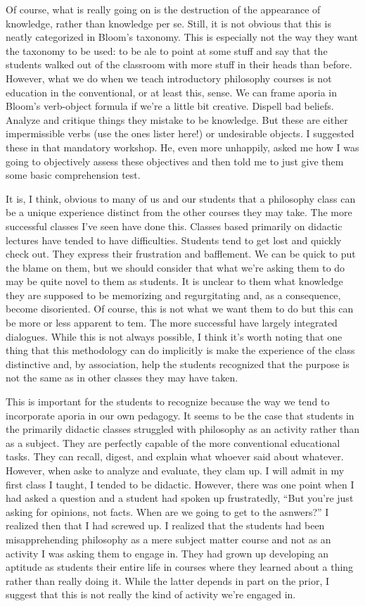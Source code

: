\documentclass[letterpaper,notitlepage,12pt]{article}
\begin{document}
Of course, what is really going on is the destruction of the appearance of
knowledge, rather than knowledge per se.
Still, it is not obvious that this is neatly categorized in Bloom's taxonomy.
This is especially not the way they want the taxonomy to be used: to be ale to
point at some stuff and say that the students walked out of the classroom with
more stuff in their heads than before.
However, what we do when we teach introductory philosophy courses is not
education in the conventional, or at least this, sense.
We can frame aporia in Bloom's verb-object formula if we're a little bit
creative.
Dispell bad beliefs.
Analyze and critique things they mistake to be knowledge.
But these are either impermissible verbs (use the ones lister here!) or
undesirable objects.
I suggested these in that mandatory workshop.
He, even more unhappily, asked me how I was going to objectively assess these
objectives and then told me to just give them some basic comprehension test.

It is, I think, obvious to many of us and our students that a philosophy class
can be a unique experience distinct from the other courses they may take.
The more successful classes I've seen have done this.
Classes based primarily on didactic lectures have tended to have difficulties.
Students tend to get lost and quickly check out.
They express their frustration and bafflement.
We can be quick to put the blame on them, but we should consider that what we're
asking them to do may be quite novel to them as students.
It is unclear to them what knowledge they are supposed to be memorizing and
regurgitating and, as a consequence, become disoriented.
Of course, this is not what we want them to do but this can be more or less
apparent to tem.
The more successful have largely integrated dialogues.
While this is not always possible, I think it's worth noting that one thing that
this methodology can do implicitly is make the experience of the class
distinctive and, by association, help the students recognized that the purpose
is not the same as in other classes they may have taken.

This is important for the students to recognize because the way we tend to
incorporate aporia in our own pedagogy.
It seems to be the case that students in the primarily didactic classes
struggled with philosophy as an activity rather than as a subject.
They are perfectly capable of the more conventional educational tasks.
They can recall, digest, and explain what whoever said about whatever.
However, when aske to analyze and evaluate, they clam up.
I will admit in my first class I taught, I tended to be didactic.
However, there was one point when I had asked a question and a student had
spoken up frustratedly, ``But you're just asking for opinions, not facts. When
are we going to get to the asnwers?''
I realized then that I had screwed up.
I realized that the students had been misapprehending philosophy as a mere
subject matter course and not as an activity I was asking them to engage in.
They had grown up developing an aptitude as students their entire life in
courses where they learned about a thing rather than really doing it.
While the latter depends in part on the prior, I suggest that this is not really
the kind of activity we're engaged in.
\end{document}
